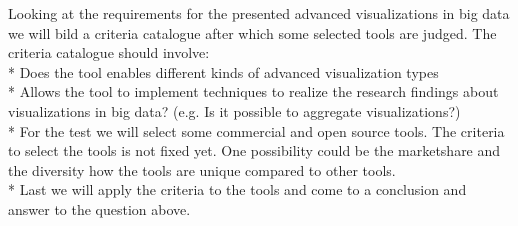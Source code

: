 Looking at the requirements for the presented advanced visualizations in big data we will bild a criteria catalogue after which some selected tools are judged. The criteria catalogue should involve:\\*
Does the tool enables different kinds of advanced visualization types\\*
Allows the tool to implement techniques to realize the research findings about visualizations in big data? (e.g. Is it possible to aggregate visualizations?) \\*
For the test we will select some commercial and open source tools. The criteria to select the tools is not fixed yet. One possibility could be the marketshare and the diversity how the tools are unique compared to other tools.\\*
Last we will apply the criteria to the tools and come to a conclusion and answer to the question above.
